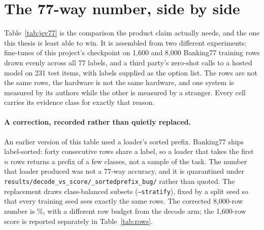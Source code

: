 \section{The 77-way number, side by side}

Table~\ref{tab:jev77} is the comparison the product claim actually needs, and
the one this thesis is least able to win. It is assembled from two different
experiments: fine-tunes of this project's checkpoint on 1,600 and 8,000
Banking77 training rows drawn evenly across all 77 labels, and a third party's
zero-shot calls to a hosted model on 231 test items, with labels supplied as the
option list. The rows are not the same rows, the hardware is not the same
hardware, and one system is measured by its authors while the other is measured
by a stranger. Every cell carries its evidence class for exactly that reason.

\paragraph{A correction, recorded rather than quietly replaced.}
An earlier version of this table used a loader's sorted prefix. Banking77 ships
label-sorted: forty consecutive rows share a label, so a loader that takes the
first $n$ rows returns a prefix of a few classes, not a sample of the task. The
number that loader produced was not a 77-way accuracy, and it is quarantined
under \texttt{results/decode\_vs\_score/\_sortedprefix\_bug/} rather than
quoted. The replacement draws class-balanced subsets (\texttt{--stratify}),
fixed by a split seed so that every training seed sees exactly the same rows.
The corrected 8,000-row number is \CmpBankScorePct\%, with a different row
budget from the decode arm; the 1,600-row score is reported separately in
Table~\ref{tab:rows}.

